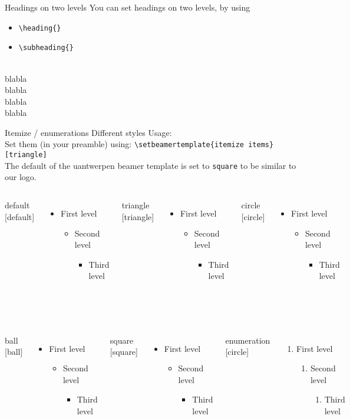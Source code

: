 \documentclass[aspectratio=1610]{beamer}
\newcommand*\command[1]{{\tt \textbackslash #1}}
\begin{document}
\begin{frame}[negative]
  \sectionpage
\end{frame}

\begin{frame}[t]
  {Headings}
  {on two levels}
  You can set headings on two levels, by using
  \begin{itemize}
  \item\command{heading\{\}}
  \item\command{subheading\{\}}
  \end{itemize}
  ~\\
  blabla
  ~\\
  blabla
  ~\\
  blabla
  ~\\
  blabla
\end{frame}

\newcommand\listdemo[1][itemize]{
  \begin{#1}
  \item First level
    \begin{#1}
    \item Second level
      \begin{#1}
      \item Third level
      \end{#1}
    \end{#1}
  \end{#1}
}

\begin{frame}[t]
  {Itemize / enumerations}
  {Different styles}
  Usage:\\
  Set them (in your preamble) using: \command{setbeamertemplate\{itemize items\}[triangle]}\\
  The default of the uantwerpen beamer template is set to \texttt{square} to be
  similar to our logo.
  \medskip

  \begin{columns}
    \alert{default}
    [default]
    \listdemo
    \alert{triangle}
    [triangle]
    \listdemo
    \alert{circle}
    [circle]
    \listdemo
  \end{columns}~\\
  \bigskip

  \begin{columns}
    \alert{ball}
    [ball]
    \listdemo
    \alert{square}
    [square]
    \listdemo
    \alert{enumeration}
    [circle]
    \listdemo[enumerate]
  \end{columns}
\end{frame}
\end{document}
